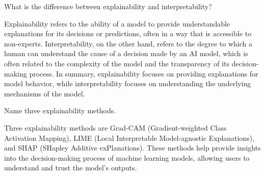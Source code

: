 \begin{ejercicio}
    What is the difference between explainability and interpretability?

    Explainability refers to the ability of a model to provide understandable explanations for its decisions or predictions, often in a way that is accessible to non-experts. Interpretability, on the other hand, refers to the degree to which a human can understand the cause of a decision made by an AI model, which is often related to the complexity of the model and the transparency of its decision-making process. In summary, explainability focuses on providing explanations for model behavior, while interpretability focuses on understanding the underlying mechanisms of the model.
\end{ejercicio}

\begin{ejercicio}
    Name three explainability methods.

    Three explainability methods are Grad-CAM (Gradient-weighted Class Activation Mapping), LIME (Local Interpretable Model-agnostic Explanations), and SHAP (SHapley Additive exPlanations). These methods help provide insights into the decision-making process of machine learning models, allowing users to understand and trust the model's outputs.
\end{ejercicio}